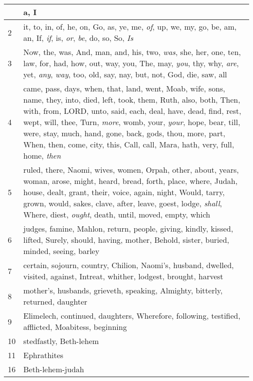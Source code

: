 \begin{longtable}{l|p{3.75in}}
\hline \hline
\endlastfoot
1 & a, I \\ \hline
2 & it, to, in, of, he, on, Go, as, ye, me, \emph{of}, up, we, my, go, be, am, an, If, \emph{if}, is, \emph{or}, \emph{be}, do, so, So, \emph{Is} \\ \hline
3 & Now, the, was, And, man, and, his, two, \emph{was}, she, her, one, ten, law, for, had, how, out, way, you, The, may, \emph{you}, thy, why, \emph{are}, yet, \emph{any}, \emph{way}, too, old, say, nay, but, not, God, die, saw, all \\ \hline
4 & came, pass, days, when, that, land, went, Moab, wife, sons, name, they, into, died, left, took, them, Ruth, also, both, Then, with, from, LORD, unto, said, each, deal, have, dead, find, rest, wept, will, thee, Turn, \emph{more}, womb, your, \emph{your}, hope, bear, till, were, stay, much, hand, gone, back, gods, thou, more, part, When, then, come, city, this, Call, call, Mara, hath, very, full, home, \emph{then} \\ \hline
5 & ruled, there, Naomi, wives, women, Orpah, other, about, years, woman, arose, might, heard, bread, forth, place, where, Judah, house, dealt, grant, their, voice, again, night, Would, tarry, grown, would, sakes, clave, after, leave, goest, lodge, \emph{shall}, Where, diest, \emph{ought}, death, until, moved, empty, which \\ \hline
6 & judges, famine, Mahlon, return, people, giving, kindly, kissed, lifted, Surely, should, having, mother, Behold, sister, buried, minded, seeing, barley \\ \hline
7 & certain, sojourn, country, Chilion, Naomi's, husband, dwelled, visited, against, Intreat, whither, lodgest, brought, harvest \\ \hline
8 & mother's, husbands, grieveth, speaking, Almighty, bitterly, returned, daughter \\ \hline
9 & Elimelech, continued, daughters, Wherefore, following, testified, afflicted, Moabitess, beginning \\ \hline
10 & stedfastly, Beth-lehem \\ \hline
11 & Ephrathites \\ \hline
16 & Beth-lehem-judah \\ \hline
\end{longtable}






 



